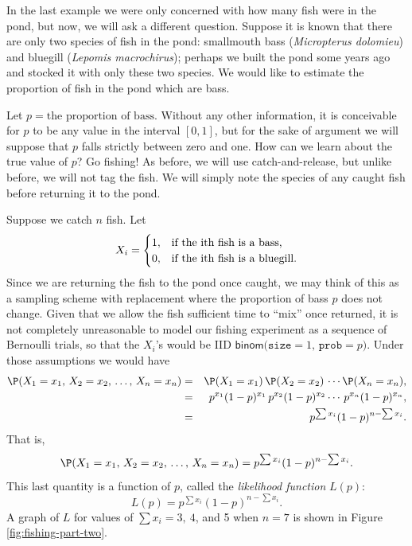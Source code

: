 \documentclass[captions=tableheading]{scrbook}
\begin{document}
\begin{example}
\label{exa:bass-bluegill}
In the last example we were only concerned with how many fish were in the pond, but now, we will ask a different question. Suppose it is known that there are only two species of fish in the pond: smallmouth bass (\emph{Micropterus dolomieu}) and bluegill (\emph{Lepomis macrochirus}); perhaps we built the pond some years ago and stocked it with only these two species. We would like to estimate the proportion of fish in the pond which are bass.

Let \(p=\mbox{the proportion of bass}\). Without any other information, it is conceivable for \(p\) to be any value in the interval \([0,1]\), but for the sake of argument we will suppose that \(p\) falls strictly between zero and one. How can we learn about the true value of \(p\)? Go fishing! As before, we will use catch-and-release, but unlike before, we will not tag the fish. We will simply note the species of any caught fish before returning it to the pond. 

Suppose we catch \(n\) fish. Let
\[
X_{i}=
\begin{cases}
1, & \mbox{if the \mbox{i}\mbox{th} fish is a bass,}\\
0, & \mbox{if the \mbox{i}\mbox{th} fish is a bluegill.}
\end{cases}
\]
Since we are returning the fish to the pond once caught, we may think of this as a sampling scheme with replacement where the proportion of bass \(p\) does not change. Given that we allow the fish sufficient time to ``mix'' once returned, it is not completely unreasonable to model our fishing experiment as a sequence of Bernoulli trials, so that the \(X_{i}\)'s would be IID \(\mathsf{binom(\mathtt{size}}=1,\,\mathtt{prob}=p)\). Under those assumptions we would have
\begin{eqnarray*}
\P(X_{1}=x_{1},\, X_{2}=x_{2},\,\ldots,\, X_{n}=x_{n}) & = & \P(X_{1}=x_{1})\,\P(X_{2}=x_{2})\,\cdots\P(X_{n}=x_{n}),\\
 & = & p^{x_{1}}(1-p)^{x_{1}}\, p^{x_{2}}(1-p)^{x_{2}}\cdots\, p^{x_{n}}(1-p)^{x_{n}},\\
 & = & p^{\sum x_{i}}(1-p)^{n-\sum x_{i}}.
\end{eqnarray*}
That is, 
\[
\P(X_{1}=x_{1},\, X_{2}=x_{2},\,\ldots,\, X_{n}=x_{n})=p^{\sum x_{i}}(1-p)^{n-\sum x_{i}}.
\]
This last quantity is a function of \(p\), called the \emph{likelihood function} \(L(p)\):
\[
L(p)=p^{\sum x_{i}}(1-p)^{n-\sum x_{i}}.
\]
A graph of \(L\) for values of \(\sum x_{i}=3,\ 4\), and 5 when \(n=7\) is shown in Figure \ref{fig:fishing-part-two}. 



\end{example}
\end{document}
